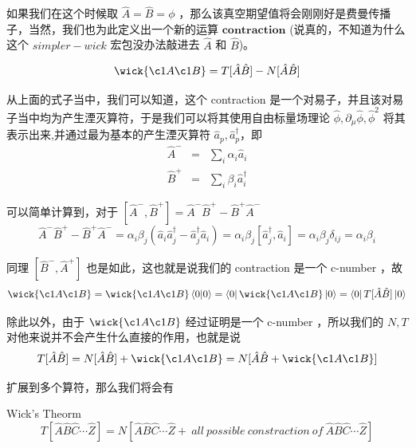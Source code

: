 如果我们在这个时候取 $\hat{A} = \hat{B} = \phi$ ，那么该真空期望值将会刚刚好是费曼传播子，当然，我们也为此定义出一个新的运算 $\mathbf{contraction}$ (说真的，不知道为什么这个 $simpler-wick$ 宏包没办法敲进去 $\hat{A}$ 和 $\hat{B}$)。

\begin{equation}
    \wick{
        \c1 A   \c1 B
    } = T[\hat{A}\hat{B}] - N[\hat{A}\hat{B}]
\end{equation}

从上面的式子当中，我们可以知道，这个 contraction 是一个对易子，并且该对易子当中均为产生湮灭算符，于是我们可以将其使用自由标量场理论 $\hat{\phi},\partial_\mu \hat{\phi},\hat{\phi}^2$ 将其表示出来,并通过最为基本的产生湮灭算符 $\hat{a}_p,\hat{a}_{p}^\dagger$，即 
\begin{eqnarray*}
    \hat{A}^{-} &=& \sum_i \alpha_i \hat{a}_i \\
    \hat{B}^{+} &=& \sum_i \beta_i \hat{a}_i^\dagger
\end{eqnarray*}

可以简单计算到，对于 $[\hat{A}^-,\hat{B}^+] = \hat{A}^-\hat{B}^+ - \hat{B}^+\hat{A}^-$
\begin{equation}
    \hat{A}^-\hat{B}^+ - \hat{B}^+\hat{A}^- = \alpha_i \beta_j \left(\hat{a}_i \hat{a}_j^\dagger - \hat{a}_j^\dagger\hat{a}_i\right) = \alpha_i \beta_j [\hat{a}_j^\dagger,\hat{a}_i] = \alpha_i \beta_j \delta_{ij} = \alpha_i \beta_i
\end{equation}

同理 $[\hat{B}^-,\hat{A}^+]$ 也是如此，这也就是说我们的 contraction 是一个 c-number ，故
\begin{equation}
    \wick{
        \c1 A   \c1 B
    } = 
    \wick{
        \c1 A   \c1 B
    }\braket{0}{0} =
    \bra{0}
    \wick{
        \c1 A   \c1 B
    }\ket{0} = 
    \bra{0}T[\hat{A}\hat{B}]\ket{0}
\end{equation}

除此以外，由于 $\wick{\c1 A \c1 B}$ 经过证明是一个 c-number ，所以我们的 $N,T$ 对他来说并不会产生什么直接的作用，也就是说
\begin{equation}
    T[\hat{A}\hat{B}] = N[\hat{A}\hat{B}] + \wick{\c1 A \c1 B} = N[\hat{A}\hat{B} + \wick{\c1 A \c1 B}]
\end{equation}

扩展到多个算符，那么我们将会有
\begin{theorem}{Wick's Theorm}
    \begin{equation}
        T[\hat{A}\hat{B}\hat{C}\cdots\hat{Z}] = N\left[\hat{A}\hat{B}\hat{C}\cdots\hat{Z} + \ all\ possible\ constraction\ of\ \hat{A}\hat{B}\hat{C}\cdots\hat{Z}\right]
    \end{equation}
\end{theorem}


